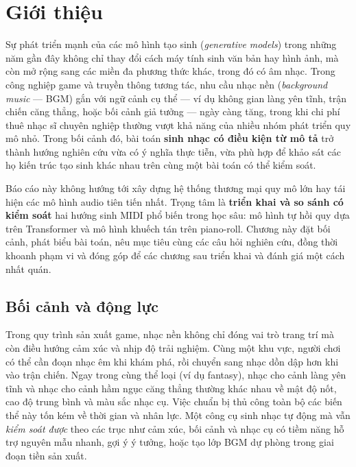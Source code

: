 \chapter{Giới thiệu}
\label{chap:intro}

Sự phát triển mạnh của các mô hình tạo sinh (\textit{generative models}) trong những năm gần đây không chỉ thay đổi cách máy tính sinh văn bản hay hình ảnh, mà còn mở rộng sang các miền đa phương thức khác, trong đó có âm nhạc. Trong công nghiệp game và truyền thông tương tác, nhu cầu nhạc nền (\textit{background music} --- BGM) gắn với ngữ cảnh cụ thể --- ví dụ không gian làng yên tĩnh, trận chiến căng thẳng, hoặc bối cảnh giả tưởng --- ngày càng tăng, trong khi chi phí thuê nhạc sĩ chuyên nghiệp thường vượt khả năng của nhiều nhóm phát triển quy mô nhỏ. Trong bối cảnh đó, bài toán \textbf{sinh nhạc có điều kiện từ mô tả} trở thành hướng nghiên cứu vừa có ý nghĩa thực tiễn, vừa phù hợp để khảo sát các họ kiến trúc tạo sinh khác nhau trên cùng một bài toán có thể kiểm soát.

Báo cáo này không hướng tới xây dựng hệ thống thương mại quy mô lớn hay tái hiện các mô hình audio tiên tiến nhất. Trọng tâm là \textbf{triển khai và so sánh có kiểm soát} hai hướng sinh MIDI phổ biến trong học sâu: mô hình tự hồi quy dựa trên Transformer và mô hình khuếch tán trên piano-roll. Chương này đặt bối cảnh, phát biểu bài toán, nêu mục tiêu cùng các câu hỏi nghiên cứu, đồng thời khoanh phạm vi và đóng góp để các chương sau triển khai và đánh giá một cách nhất quán.

\section{Bối cảnh và động lực}
\label{sec:ch1-motivation}

Trong quy trình sản xuất game, nhạc nền không chỉ đóng vai trò trang trí mà còn điều hướng cảm xúc và nhịp độ trải nghiệm. Cùng một khu vực, người chơi có thể cần đoạn nhạc êm khi khám phá, rồi chuyển sang nhạc dồn dập hơn khi vào trận chiến. Ngay trong cùng thể loại (ví dụ fantasy), nhạc cho cảnh làng yên tĩnh và nhạc cho cảnh hầm ngục căng thẳng thường khác nhau về mật độ nốt, cao độ trung bình và màu sắc nhạc cụ. Việc chuẩn bị thủ công toàn bộ các biến thể này tốn kém về thời gian và nhân lực. Một công cụ sinh nhạc tự động mà vẫn \textit{kiểm soát được} theo các trục như cảm xúc, bối cảnh và nhạc cụ có tiềm năng hỗ trợ nguyên mẫu nhanh, gợi ý ý tưởng, hoặc tạo lớp BGM dự phòng trong giai đoạn tiền sản xuất.

